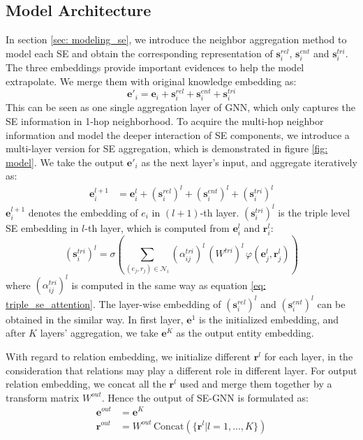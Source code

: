 \documentclass[letterpaper]{article} \usepackage{aaai22}  \usepackage{times}  \usepackage{helvet}  \usepackage{courier}  \usepackage[hyphens]{url}  \usepackage{graphicx} \urlstyle{rm} \def\UrlFont{\rm}  \usepackage{natbib}  \usepackage{caption} \DeclareCaptionStyle{ruled}{labelfont=normalfont,labelsep=colon,strut=off} \frenchspacing  \setlength{\pdfpagewidth}{8.5in}  \setlength{\pdfpageheight}{11in}  \usepackage{algorithm}
\begin{document}
\subsection{Model Architecture}
\label{sec: model arch}
In section \ref{sec: modeling_se}, we introduce the neighbor aggregation method to model each SE and obtain the corresponding representation of $\mathbf{s}_i^{rel}$, $\mathbf{s}_i^{ent}$ and $\mathbf{s}_i^{tri}$. The three embeddings provide important evidences to help the model extrapolate. We merge them with original knowledge embedding as: 
\begin{equation}
    \mathbf{e}'_i = \mathbf{e}_i + \mathbf{s}_i^{rel} + \mathbf{s}_i^{ent} + \mathbf{s}_i^{tri}
    \label{eq: 1_layer_agg}
\end{equation}
This can be seen as one single aggregation layer of GNN, which only captures the SE information in 1-hop neighborhood. To acquire the multi-hop neighbor information and model the deeper interaction of SE components, we introduce a multi-layer version for SE aggregation, which is demonstrated in figure \ref{fig: model}. We take the output $\mathbf{e}'_i$ as the next layer's input, and aggregate iteratively as:
\begin{align}
    \label{eq: n_layer_agg}
    \mathbf{e}^{l+1}_i &= \mathbf{e}^{l}_i + (\mathbf{s}_i^{rel})^{l} + (\mathbf{s}_i^{ent})^{l} + (\mathbf{s}_i^{tri})^{l}
\end{align}
$\mathbf{e}^{l+1}_i$ denotes the embedding of $e_i$ in $(l+1)$-th layer. $(\mathbf{s}_i^{tri})^{l}$ is the triple level SE embedding in $l$-th layer, which is computed from $\mathbf{e}^{l}_i$ and $\mathbf{r}^{l}_i$: 
\begin{equation}
    (\mathbf{s}_i^{tri})^{l} = \sigma\left( \sum_{(e_j, r_j) \in \mathcal{N}_i} (\alpha^{tri}_{ij})^{l} \, (W^{tri})^{l} \, \varphi(\mathbf{e}^{l}_j, \mathbf{r}^{l}_j) \right)
\end{equation}
where $(\alpha^{tri}_{ij})^{l}$ is computed in the same way as equation \ref{eq: triple_se_attention}. The layer-wise embedding of $(\mathbf{s}_i^{rel})^{l}$ and $(\mathbf{s}_i^{ent})^{l}$ can be obtained in the similar way. 
In first layer, $\mathbf{e}^{1}$ is the initialized embedding, and after $K$ layers' aggregation, we take $\mathbf{e}^{K}$ as the output entity embedding.

With regard to relation embedding, we initialize different $\mathbf{r}^{l}$ for each layer, in the consideration that relations may play a different role in different layer.  
For output relation embedding, we concat all the $\mathbf{r}^l$ used and merge them together by a transform matrix $W^{out}$. Hence the output of SE-GNN is formulated as:  
\begin{equation}
    \label{eq: SE-GNN output}
    \begin{split}
        \mathbf{e}^{out} &= \mathbf{e}^{K} \\ 
        \mathbf{r}^{out} &= W^{out} \, \mathrm{Concat}(\{\mathbf{r}^{l} | l=1,...,K\}) 
    \end{split}
\end{equation}
\end{document}
